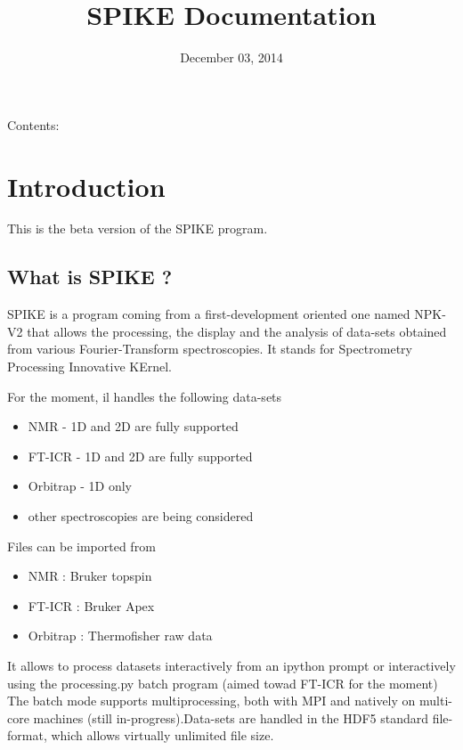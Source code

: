 \documentclass[letterpaper,10pt,openany,oneside]{sphinxmanual}
\title{SPIKE Documentation}
\date{December 03, 2014}
\author{}
\begin{document}
\maketitle
\tableofcontents
{}\label{index::doc}


Contents:


\chapter{Introduction}
\label{rst/introduction:introduction}\label{rst/introduction::doc}\label{rst/introduction:welcome-to-spike-documentation}
This is the beta version of the SPIKE program.


\section{What is SPIKE ?}
\label{rst/introduction:what-is-spike}
SPIKE is a program coming from a first-development oriented one named NPK-V2 that allows the processing, the display and the analysis of data-sets obtained from various Fourier-Transform spectroscopies. It stands for Spectrometry Processing Innovative KErnel.

For the moment, il handles the following data-sets
\begin{itemize}
\item {} 
NMR - 1D and 2D are fully supported

\item {} 
FT-ICR - 1D and 2D are fully supported

\item {} 
Orbitrap - 1D only

\item {} 
other spectroscopies are being considered

\end{itemize}

Files can be imported from
\begin{itemize}
\item {} 
NMR : Bruker topspin

\item {} 
FT-ICR : Bruker Apex

\item {} 
Orbitrap : Thermofisher raw data

\end{itemize}

It allows to process datasets interactively from an ipython prompt or interactively using the processing.py batch program (aimed towad FT-ICR for the moment)
The batch mode supports multiprocessing, both with MPI and natively on multi-core machines (still in-progress).Data-sets are handled in the HDF5 standard file-format, which allows virtually unlimited file size.
\end{document}
